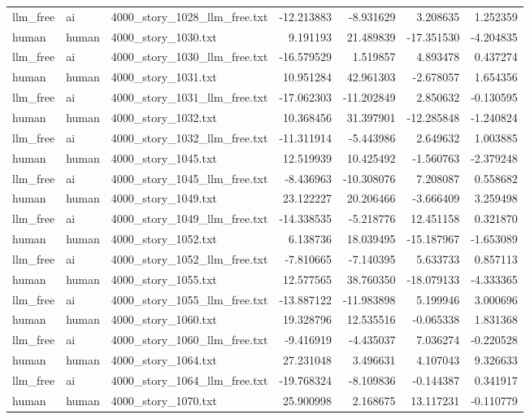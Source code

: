 \begin{longtable}{lllrrrr}
llm\_free & ai & 4000\_story\_1028\_llm\_free.txt & -12.213883 & -8.931629 & 3.208635 & 1.252359 \\
human & human & 4000\_story\_1030.txt & 9.191193 & 21.489839 & -17.351530 & -4.204835 \\
llm\_free & ai & 4000\_story\_1030\_llm\_free.txt & -16.579529 & 1.519857 & 4.893478 & 0.437274 \\
human & human & 4000\_story\_1031.txt & 10.951284 & 42.961303 & -2.678057 & 1.654356 \\
llm\_free & ai & 4000\_story\_1031\_llm\_free.txt & -17.062303 & -11.202849 & 2.850632 & -0.130595 \\
human & human & 4000\_story\_1032.txt & 10.368456 & 31.397901 & -12.285848 & -1.240824 \\
llm\_free & ai & 4000\_story\_1032\_llm\_free.txt & -11.311914 & -5.443986 & 2.649632 & 1.003885 \\
human & human & 4000\_story\_1045.txt & 12.519939 & 10.425492 & -1.560763 & -2.379248 \\
llm\_free & ai & 4000\_story\_1045\_llm\_free.txt & -8.436963 & -10.308076 & 7.208087 & 0.558682 \\
human & human & 4000\_story\_1049.txt & 23.122227 & 20.206466 & -3.666409 & 3.259498 \\
llm\_free & ai & 4000\_story\_1049\_llm\_free.txt & -14.338535 & -5.218776 & 12.451158 & 0.321870 \\
human & human & 4000\_story\_1052.txt & 6.138736 & 18.039495 & -15.187967 & -1.653089 \\
llm\_free & ai & 4000\_story\_1052\_llm\_free.txt & -7.810665 & -7.140395 & 5.633733 & 0.857113 \\
human & human & 4000\_story\_1055.txt & 12.577565 & 38.760350 & -18.079133 & -4.333365 \\
llm\_free & ai & 4000\_story\_1055\_llm\_free.txt & -13.887122 & -11.983898 & 5.199946 & 3.000696 \\
human & human & 4000\_story\_1060.txt & 19.328796 & 12.535516 & -0.065338 & 1.831368 \\
llm\_free & ai & 4000\_story\_1060\_llm\_free.txt & -9.416919 & -4.435037 & 7.036274 & -0.220528 \\
human & human & 4000\_story\_1064.txt & 27.231048 & 3.496631 & 4.107043 & 9.326633 \\
llm\_free & ai & 4000\_story\_1064\_llm\_free.txt & -19.768324 & -8.109836 & -0.144387 & 0.341917 \\
human & human & 4000\_story\_1070.txt & 25.900998 & 2.168675 & 13.117231 & -0.110779 \\

\end{longtable}
